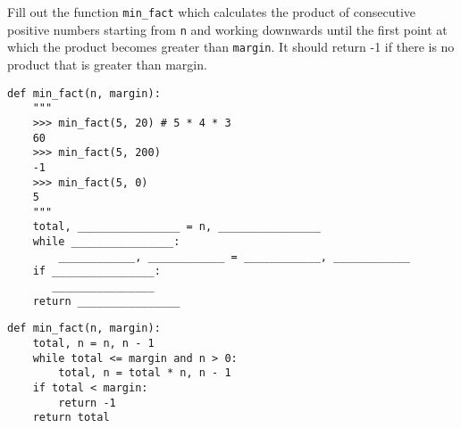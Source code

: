 \question Fill out the function \lstinline{min_fact} which calculates the product of consecutive positive numbers starting from \lstinline{n} and working downwards until the first point at which the product becomes greater than \lstinline{margin}. It should return -1 if there is no product that is greater than margin.

\begin{blocksection}
\begin{lstlisting}
def min_fact(n, margin):
    """
    >>> min_fact(5, 20) # 5 * 4 * 3
    60
    >>> min_fact(5, 200)
    -1
    >>> min_fact(5, 0)
    5
    """
    total, ________________ = n, ________________
    while ________________:
        ____________, ____________ = ____________, ____________
    if ________________:
       ________________
    return ________________

\end{lstlisting}
\end{blocksection}

\begin{blocksection}
\begin{solution}
\begin{lstlisting}
def min_fact(n, margin):
    total, n = n, n - 1
    while total <= margin and n > 0:
        total, n = total * n, n - 1
    if total < margin:
        return -1
    return total
\end{lstlisting}
\end{solution}
\end{blocksection}